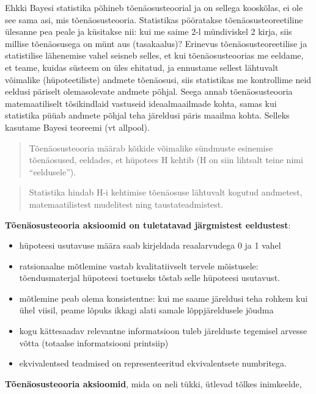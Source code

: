 \documentclass[]{book}
\begin{document}
Ehkki Bayesi statistika põhineb tõenäosusteoorial ja on sellega kooskõlas, ei ole see sama asi, mis tõenäosusteooria.
Statistikas pööratakse tõenäosusteoreetiline ülesanne pea peale ja küsitakse nii: kui me saime 2-l mündiviskel 2 kirja, siis millise tõenäosusega on münt aus (tasakaalus)? Erinevus tõenäosusteoreetilise ja statistilise lähenemise vahel seisneb selles, et kui tõenäosusteoorias me eeldame, et teame, kuidas süsteem on üles ehitatud, ja ennustame sellest lähtuvalt võimalike (hüpoteetiliste) andmete tõenäosusi, siis statistikas me kontrollime neid eeldusi päriselt olemasolevate andmete põhjal. Seega annab tõenäosusteooria matemaatiliselt tõsikindlaid vastuseid ideaalmaailmade kohta, samas kui statistika püüab andmete põhjal teha järeldusi päris maailma kohta. Selleks kasutame Bayesi teoreemi (vt allpool).

\begin{quote}
Tõenäosusteooria määrab kõikide võimalike sündmuste esinemise tõenäosused, eeldades, et hüpotees H kehtib (H on siin lihtsalt teine nimi ``eeldusele'').
\end{quote}

\begin{quote}
Statistika hindab H-i kehtimise tõenäosuse lähtuvalt kogutud andmetest, matemaatilistest mudelitest ning taustateadmistest.
\end{quote}

\textbf{Tõenäosusteooria aksioomid on tuletatavad järgmistest eeldustest}:

\begin{itemize}
\item
  hüpoteesi usutavuse määra saab kirjeldada reaalarvudega 0 ja 1 vahel
\item
  ratsionaalne mõtlemine vastab kvalitatiivselt tervele mõistusele: tõendusmaterjal hüpoteesi toetuseks tõstab selle hüpoteesi usutavust.
\item
  mõtlemine peab olema konsistentne: kui me saame järeldusi teha rohkem kui ühel viisil, peame lõpuks ikkagi alati samale lõppjäreldusele jõudma
\item
  kogu kättesaadav relevantne informatsioon tuleb järelduste tegemisel arvesse võtta (totaalse informatsiooni printsiip)
\item
  ekvivalentsed teadmised on representeeritud ekvivalentsete numbritega.
\end{itemize}

\textbf{Tõenäosusteooria aksioomid}, mida on neli tükki, ütlevad tõlkes inimkeelde,
\end{document}

